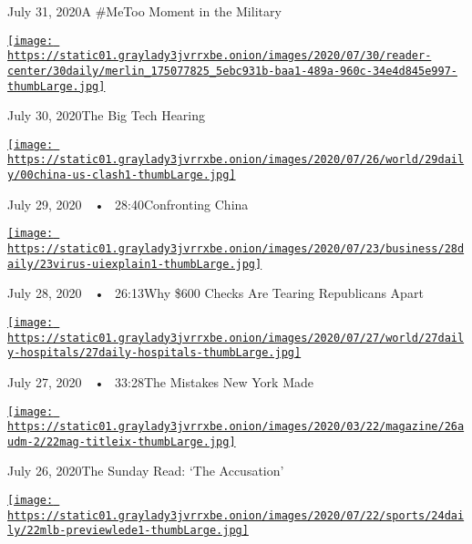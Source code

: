 July 31, 2020A \#MeToo Moment in the Military

\href{https://www.nytimes3xbfgragh.onion/2020/07/30/podcasts/the-daily/congress-facebook-amazon-google-apple.html?action=click\&module=audio-series-bar\&region=header\&pgtype=Article}{\texttt{[image: https://static01.graylady3jvrrxbe.onion/images/2020/07/30/reader-center/30daily/merlin\_175077825\_5ebc931b-baa1-489a-960c-34e4d845e997-thumbLarge.jpg]}}

July 30, 2020The Big Tech Hearing

\href{https://www.nytimes3xbfgragh.onion/2020/07/29/podcasts/the-daily/china-trump-foreign-policy.html?action=click\&module=audio-series-bar\&region=header\&pgtype=Article}{\texttt{[image: https://static01.graylady3jvrrxbe.onion/images/2020/07/26/world/29daily/00china-us-clash1-thumbLarge.jpg]}}

July 29, 2020~~•~ 28:40Confronting China

\href{https://www.nytimes3xbfgragh.onion/2020/07/28/podcasts/the-daily/unemployment-benefits-coronavirus.html?action=click\&module=audio-series-bar\&region=header\&pgtype=Article}{\texttt{[image: https://static01.graylady3jvrrxbe.onion/images/2020/07/23/business/28daily/23virus-uiexplain1-thumbLarge.jpg]}}

July 28, 2020~~•~ 26:13Why \$600 Checks Are Tearing Republicans Apart

\href{https://www.nytimes3xbfgragh.onion/2020/07/27/podcasts/the-daily/new-york-hospitals-covid.html?action=click\&module=audio-series-bar\&region=header\&pgtype=Article}{\texttt{[image: https://static01.graylady3jvrrxbe.onion/images/2020/07/27/world/27daily-hospitals/27daily-hospitals-thumbLarge.jpg]}}

July 27, 2020~~•~ 33:28The Mistakes New York Made

\href{https://www.nytimes3xbfgragh.onion/2020/07/26/podcasts/the-daily/the-accusation-the-sunday-read.html?action=click\&module=audio-series-bar\&region=header\&pgtype=Article}{\texttt{[image: https://static01.graylady3jvrrxbe.onion/images/2020/03/22/magazine/26audm-2/22mag-titleix-thumbLarge.jpg]}}

July 26, 2020The Sunday Read: `The Accusation'

\href{https://www.nytimes3xbfgragh.onion/2020/07/24/podcasts/the-daily/mlb-baseball-season-coronavirus.html?action=click\&module=audio-series-bar\&region=header\&pgtype=Article}{\texttt{[image: https://static01.graylady3jvrrxbe.onion/images/2020/07/22/sports/24daily/22mlb-previewlede1-thumbLarge.jpg]}}


